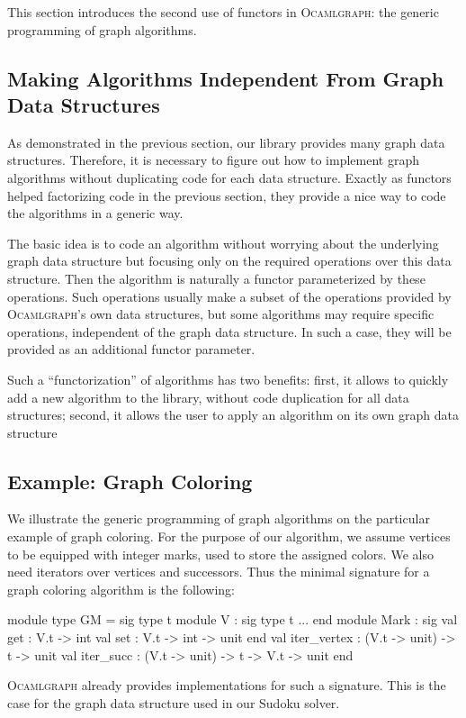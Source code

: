 \documentclass[tfpsymp]{tfp05symp}
\newcommand{\ocamlgraph}{\textsc{Ocamlgraph}\xspace}
\begin{document}
This section introduces the second use of functors in \ocamlgraph: the
generic programming of graph algorithms.

\subsection{Making Algorithms Independent From Graph Data
  Structures}

As demonstrated in the previous section, our library provides many
graph data structures. Therefore, it is necessary to figure out how to
implement graph algorithms without duplicating code for each data
structure. Exactly as functors helped factorizing code in the previous
section, they provide a nice way to code the algorithms in a generic
way.

The basic idea is to code an algorithm without worrying about the
underlying graph data structure but focusing only on the required
operations over this data structure. Then the algorithm is naturally a
functor parameterized by these operations. Such operations usually
make a subset of the operations provided by \ocamlgraph's own data
structures, but some algorithms may require specific operations,
independent of the graph data structure. In such a case, they will be
provided as an additional functor parameter.

Such a ``functorization'' of algorithms has two benefits: first, it
allows to quickly add a new algorithm to the library, without code
duplication for all data structures; second, it allows the user to
apply an algorithm on its own graph data structure%

\subsection{Example: Graph Coloring}
\label{coloring}

We illustrate the generic programming of graph algorithms on the
particular example of graph coloring.  For the purpose of our
algorithm, we assume vertices to be equipped with integer marks, used
to store the assigned colors. We also need iterators over vertices and
successors. Thus the minimal signature for a graph
coloring algorithm is the following:
\begin{ocaml}
module type GM = sig
  type t
  module V : sig type t ... end
  module Mark : sig
    val get : V.t -> int
    val set : V.t -> int -> unit
  end
  val iter_vertex : (V.t -> unit) -> t -> unit
  val iter_succ : (V.t -> unit) -> t -> V.t -> unit
end
\end{ocaml}
\ocamlgraph already provides implementations for such a
signature. This is the case for the graph data structure used in our
Sudoku solver.
\end{document}
